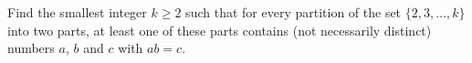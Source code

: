 Find the smallest integer $k \geq 2$ such that for every partition of the set $\{2, 3,\hdots, k\}$ into two parts, at least one of these parts contains (not necessarily distinct) numbers $a$,  $b$ and $c$ with $ab = c$.